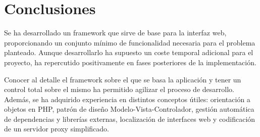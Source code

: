 \section{Conclusiones\label{extra:mvc:conclusiones}}

Se ha desarrollado un \gls{framework} que sirve de base para la interfaz web, proporcionando un conjunto mínimo de funcionalidad necesaria para el problema planteado. Aunque desarrollarlo ha supuesto un coste temporal adicional para el proyecto, ha repercutido positivamente en fases posteriores de la implementación.

Conocer al detalle el \gls{framework} sobre el que se basa la aplicación y tener un control total sobre el mismo ha permitido agilizar el proceso de desarrollo. Además, se ha adquirido experiencia en distintos conceptos útiles: orientación a objetos en \gls{PHP}, patrón de diseño Modelo-Vista-Controlador, gestión automática de dependencias y librerías externas, localización de interfaces web y codificación de un servidor \gls{proxy} simplificado.